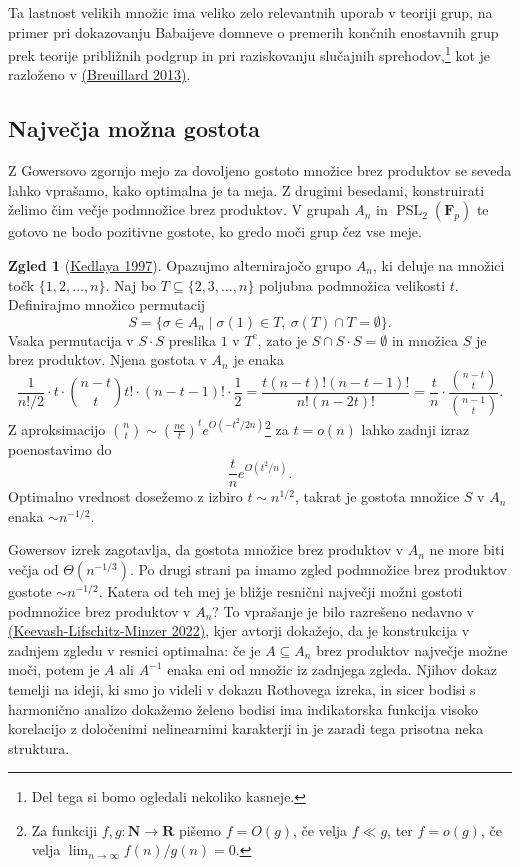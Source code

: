 \documentclass[11pt]{book}
\def\NN{\mathbf{N}}
\def\RR{\mathbf{R}}
\def\FF{\mathbf{F}}
\DeclareMathOperator\PSL{PSL}
\theoremstyle{definition}
\theoremstyle{zgled}
\newtheorem{zgled}[theorem]{Zgled}
\theoremstyle{zgledbrezstevilke}
\theoremstyle{odprtproblem}
\theoremstyle{domacanaloga}
\theoremstyle{izrek}
\begin{document}
Ta lastnost velikih množic ima veliko zelo relevantnih uporab v teoriji grup, na primer pri dokazovanju Babaijeve domneve o premerih končnih enostavnih grup prek teorije približnih podgrup in pri raziskovanju slučajnih sprehodov,\footnote{Del tega si bomo ogledali nekoliko kasneje.} kot je razloženo v \href{https://library.slmath.org/books/Book61/files/15breu.pdf}{(Breuillard 2013)}.

\subsection{Največja možna gostota}

Z Gowersovo zgornjo mejo za dovoljeno gostoto množice brez produktov se seveda lahko vprašamo, kako optimalna je ta meja. Z drugimi besedami, konstruirati želimo čim večje podmnožice brez produktov. V grupah $A_n$ in $\PSL_2(\FF_p)$ te gotovo ne bodo pozitivne gostote, ko gredo moči grup čez vse meje.

\begin{zgled}[\href{https://www.sciencedirect.com/science/article/pii/S0097316597927151}{Kedlaya 1997}]
Opazujmo alternirajočo grupo $A_n$, ki deluje na množici točk $\{ 1, 2, \dots, n \}$. Naj bo $T \subseteq \{2,3,\dots,n \}$ poljubna podmnožica velikosti $t$. Definirajmo množico permutacij
\[
S = \{ \sigma \in A_n \mid \sigma(1) \in T, \ \sigma(T) \cap T = \emptyset \}.
\]
Vsaka permutacija v $S \cdot S$ preslika $1$ v $T^c$, zato je $S \cap S \cdot S = \emptyset$ in množica $S$ je brez produktov. Njena gostota v $A_n$ je enaka
\[
  \frac{1}{n!/2} \cdot t \cdot \binom{n-t}{t} t! \cdot (n-t-1)! \cdot \frac{1}{2}
  = \frac{t (n-t)! (n-t-1)!}{n!(n-2t)!}
  = \frac{t}{n} \cdot \frac{\binom{n-t}{t}}{\binom{n-1}{t}}.
\]
Z aproksimacijo $\binom{n}{t} \sim (\frac{ne}{t})^t e^{O(- t^2/2n)}$\footnote{Za funkciji $f, g \colon \NN \to \RR$ pišemo $f = O(g)$, če velja $f \ll g$, ter $f = o(g)$, če velja $\lim_{n \to \infty} f(n)/g(n) = 0$.} za $t = o(n)$ lahko zadnji izraz poenostavimo do 
\[
    \frac{t}{n} e^{O(t^2/n)}.
\]
Optimalno vrednost dosežemo z izbiro $t \sim n^{1/2}$, takrat je gostota množice $S$ v $A_n$ enaka $\sim n^{-1/2}$. 
\end{zgled}

Gowersov izrek zagotavlja, da gostota množice brez produktov v $A_n$ ne more biti večja od $\Theta(n^{-1/3})$. Po drugi strani pa imamo zgled podmnožice brez produktov gostote $\sim n^{-1/2}$. Katera od teh mej je bližje resnični največji možni gostoti podmnožice brez produktov v $A_n$? To vprašanje je bilo razrešeno nedavno v \href{https://arxiv.org/abs/2205.15191}{(Keevash-Lifschitz-Minzer 2022)}, kjer avtorji dokažejo, da je konstrukcija v zadnjem zgledu v resnici optimalna: če je $A \subseteq A_n$ brez produktov največje možne moči, potem je $A$ ali $A^{-1}$ enaka eni od množic iz zadnjega zgleda. Njihov dokaz temelji na ideji, ki smo jo videli v dokazu Rothovega izreka, in sicer bodisi s harmonično analizo dokažemo želeno bodisi ima indikatorska funkcija visoko korelacijo z določenimi nelinearnimi karakterji in je zaradi tega prisotna neka struktura.
\end{document}
